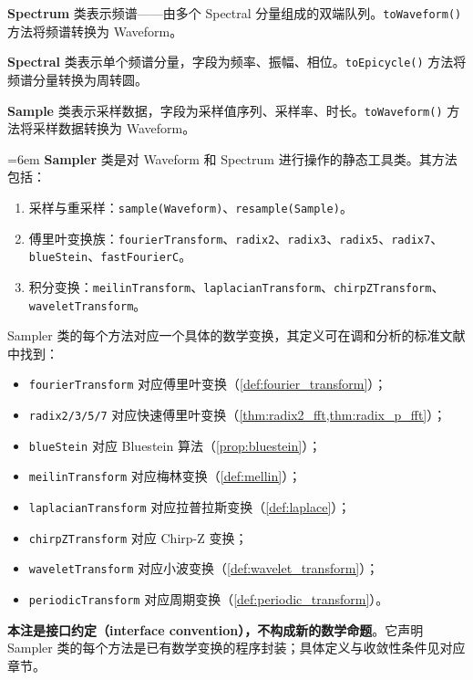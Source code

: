 \begin{definition}[Spectrum 类]\label{def:spectrum_class}
\textbf{Spectrum} 类表示频谱——由多个 Spectral 分量组成的双端队列。\texttt{toWaveform()} 方法将频谱转换为 Waveform。
\end{definition}

\begin{definition}[Spectral 类]\label{def:spectral_class}
\textbf{Spectral} 类表示单个频谱分量，字段为频率、振幅、相位。\texttt{toEpicycle()} 方法将频谱分量转换为周转圆。
\end{definition}

\begin{definition}[Sample 类]\label{def:sample_class}
\textbf{Sample} 类表示采样数据，字段为采样值序列、采样率、时长。\texttt{toWaveform()} 方法将采样数据转换为 Waveform。
\end{definition}

\begin{definition}[Sampler 类]\label{def:sampler_class}
\emergencystretch=6em
\textbf{Sampler} 类是对 Waveform 和 Spectrum 进行操作的静态工具类。其方法包括：
\begin{enumerate}[label=(\roman*)]
\rightskip=0pt plus1fil\relax
    \item 采样与重采样：\texttt{sample(Waveform)}、\texttt{resample(Sample)}。
    \item 傅里叶变换族：\texttt{fourierTransform}、\texttt{radix2}、\texttt{radix3}、\texttt{radix5}、\texttt{radix7}、\texttt{blueStein}、\texttt{fastFourierC}。
    \item 积分变换：\texttt{meilinTransform}、\texttt{laplacianTransform}、\texttt{chirpZTransform}、\texttt{waveletTransform}。
\end{enumerate}
\end{definition}

\begin{remark}\label{prop:sampler_methods}
Sampler 类的每个方法对应一个具体的数学变换，其定义可在调和分析的标准文献中找到：
\begin{itemize}
    \item \texttt{fourierTransform} 对应傅里叶变换（\cref{def:fourier_transform}）；
    \item \texttt{radix2/3/5/7} 对应快速傅里叶变换（\cref{thm:radix2_fft,thm:radix_p_fft}）；
    \item \texttt{blueStein} 对应 Bluestein 算法（\cref{prop:bluestein}）；
    \item \texttt{meilinTransform} 对应梅林变换（\cref{def:mellin}）；
    \item \texttt{laplacianTransform} 对应拉普拉斯变换（\cref{def:laplace}）；
    \item \texttt{chirpZTransform} 对应 Chirp-Z 变换；
    \item \texttt{waveletTransform} 对应小波变换（\cref{def:wavelet_transform}）；
    \item \texttt{periodicTransform} 对应周期变换（\cref{def:periodic_transform}）。
\end{itemize}
\textbf{本注是接口约定（interface convention），不构成新的数学命题}。它声明 Sampler 类的每个方法是已有数学变换的程序封装；具体定义与收敛性条件见对应章节。
\end{remark}

